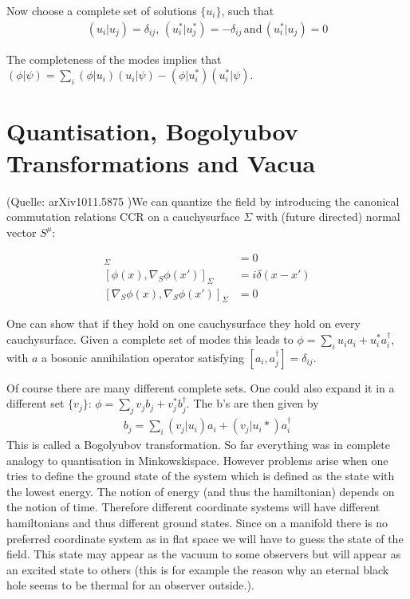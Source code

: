 Now choose a complete set of solutions $\{u_i\}$, such that
\begin{align}
(u_i| u_j) = \delta_{ij},\,(u_i^*| u_j^*) = -\delta_{ij}\,\text{and}\,(u_i^*| u_j) = 0
\end{align}

The completeness of the modes implies that \((\phi|\psi) = \sum_i (\phi|u_i)(u_i|\psi) - (\phi|u_i^*)(u_i^*|\psi)\).

\section{Quantisation, Bogolyubov Transformations and Vacua}

(Quelle: arXiv1011.5875 )We can quantize the field by introducing the canonical commutation relations CCR on a cauchysurface \(\Sigma\) with (future directed) normal vector $S^\mu$:

\begin{align}
[\phi(x),\phi(x')]_\Sigma &= 0\\
[\phi(x),\nabla_S \phi(x')]_\Sigma &= i\delta(x-x')\\
[\nabla_S \phi(x),\nabla_S \phi(x')]_\Sigma &= 0
\end{align}

One can show that if they hold on one cauchysurface they hold on every cauchysurface.
Given a complete set of modes this leads to \(\phi = \sum_i u_i a_i + u_i^* a_i^\dagger\), with \(a\) a bosonic annihilation operator satisfying \([a_i,a_j^\dagger] = \delta_{ij}\).

Of course there are many different complete sets. One could also expand it in a different set \(\{v_j\}\): \(\phi = \sum_j v_j b_j + v_j^* b_j^\dagger\). The b's are then given by 
\begin{align}
b_j = \sum_i (v_j|u_i) a_i + (v_j|u_i*) a_i^\dagger
\label{equ:qft_bogolyubov}
\end{align}
This is called a Bogolyubov transformation.
So far everything was in complete analogy to quantisation in Minkowskispace. However problems arise when one tries to define the ground state of the system which is defined as the state with the lowest energy. The notion of energy (and thus the hamiltonian) depends on the notion of time. Therefore different coordinate systems will have different hamiltonians and thus different ground states. Since on a manifold there is no preferred coordinate system as in flat space we will have to guess the state of the field. This state may appear as the vacuum to some observers but will appear as an excited state to others (this is for example the reason why an eternal black hole seems to be thermal for an observer outside.).\\

